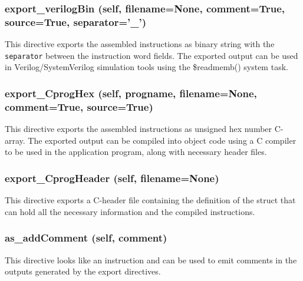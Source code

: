 \documentclass{article}
\begin{document}
\subsubsection*{export\_verilogBin (self, filename=None, comment=True, source=True, separator='\_')}
This directive exports the assembled instructions as binary string with the \texttt{separator}
between the instruction word fields.
The exported output can be used in Verilog/SystemVerilog simulation tools using
the \$readmemb() system task.


\subsubsection*{export\_CprogHex (self, progname, filename=None, comment=True, source=True)}
This directive exports the assembled instructions as unsigned hex number C-array.
The exported output can be compiled into object code using a C compiler to be
used in the application program, along with necessary header files.


\subsubsection*{export\_CprogHeader (self, filename=None)}
This directive exports a C-header file containing the definition of the struct
that can hold all the necessary information and the compiled instructions.


\subsubsection*{as\_addComment (self, comment)}
This directive looks like an instruction and can be used to emit comments in
the outputs generated by the export directives.
\end{document}
